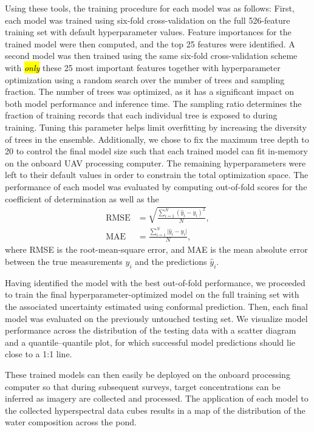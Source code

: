 \documentclass[remotesensing,article,accept,pdftex,moreauthors]{Definitions/mdpi}
\begin{document}
Using these tools, the training procedure for each model was as follows: First, each model was trained using six-fold cross-validation on the full 526-feature training set with default hyperparameter values. Feature importances for the trained model were then computed, and the top 25 features were identified. A second model was then trained using the same six-fold cross-validation scheme with \textit{\hl{only}} these 25 most important features together with hyperparameter optimization using a random search over the number of trees and sampling fraction. The number of trees was optimized, as it has a significant impact on both model performance and inference time. The sampling ratio determines the fraction of training records that each individual tree is exposed to during training. Tuning this parameter helps limit overfitting by increasing the diversity of trees in the ensemble. Additionally, we chose to fix the maximum tree depth to 20 to control the final model size such that each trained model can fit in-memory on the onboard UAV processing computer. The remaining hyperparameters were left to their default values in order to constrain the total optimization space. The performance of each model was evaluated by computing out-of-fold scores for the coefficient of determination as well as the
\begin{align}
    \text{RMSE} &= \sqrt{\frac{\sum\limits_{i=1}^N (\hat{y}_i-y_i)^2}{N}}, \\
    \text{MAE} &= \frac{\sum\limits_{i=1}^N \lvert \hat{y}_i - y_i \vert}{N},
\end{align}
where RMSE is the root-mean-square error, and MAE is the mean absolute error between the true measurements $y_i$ and the predictions $\hat{y}_i$.

Having identified the model with the best out-of-fold performance, we proceeded to train the final hyperparameter-optimized model on the full training set with the associated uncertainty estimated using conformal prediction.  Then, each final model was evaluated on the previously untouched testing set. We visualize model performance across the distribution of the testing data with a scatter diagram and a quantile--quantile plot, for which successful model predictions should lie close to a 1:1 line.

These trained models can then easily be deployed on the onboard processing computer so that during subsequent surveys, target concentrations can be inferred as imagery are collected and processed. The application of each model to the collected hyperspectral data cubes results in a map of the distribution of the water composition across the pond.
\end{document}
